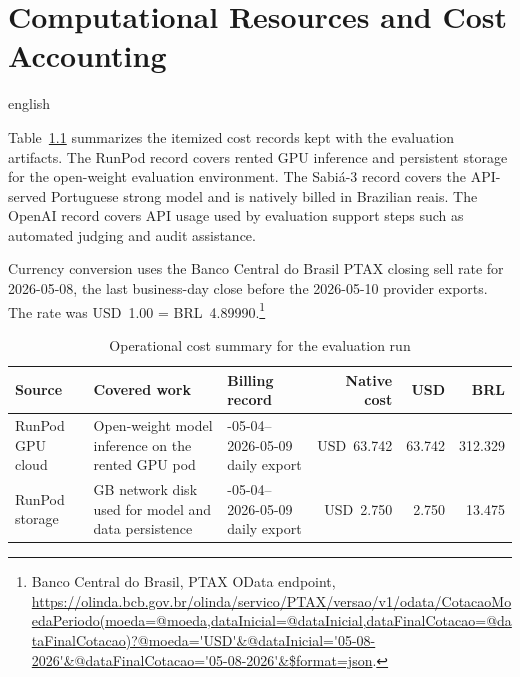 \chapter{Computational Resources and Cost Accounting}
\label{app:compute-cost-accounting}

\begin{otherlanguage*}{english}

Table~\ref{tab:compute-cost-summary} summarizes the itemized cost records kept with the evaluation artifacts. The RunPod record covers rented GPU inference and persistent storage for the open-weight evaluation environment. The Sabiá-3 record covers the API-served Portuguese strong model and is natively billed in Brazilian reais. The OpenAI record covers API usage used by evaluation support steps such as automated judging and audit assistance.

Currency conversion uses the Banco Central do Brasil PTAX closing sell rate for 2026-05-08, the last business-day close before the 2026-05-10 provider exports. The rate was USD~1.00 = BRL~4.89990.\footnote{Banco Central do Brasil, PTAX OData endpoint, \url{https://olinda.bcb.gov.br/olinda/servico/PTAX/versao/v1/odata/CotacaoMoedaPeriodo(moeda=@moeda,dataInicial=@dataInicial,dataFinalCotacao=@dataFinalCotacao)?@moeda='USD'&@dataInicial='05-08-2026'&@dataFinalCotacao='05-08-2026'&$format=json}.}

\begin{table}[htbp]
\centering
\footnotesize
\setlength\extrarowheight{2pt}
\setlength{\tabcolsep}{4pt}

\begin{tabularx}{\linewidth}{>{\raggedright\arraybackslash}p{2.35cm}>{\raggedright\arraybackslash}X>{\raggedright\arraybackslash}p{2.25cm}rrr}
\caption[Operational cost summary]{Operational cost summary for the evaluation run}
\label{tab:compute-cost-summary} \\
\toprule
\textbf{Source} & \textbf{Covered work} & \textbf{Billing record} & \textbf{Native cost} & \textbf{USD} & \textbf{BRL} \\
\midrule

RunPod GPU cloud &
Open-weight model inference on the rented GPU pod &
2026-05-04--2026-05-09 daily export &
USD~63.742 &
63.742 &
312.329 \\
\midrule

RunPod storage &
200 GB network disk used for model and data persistence &
2026-05-04--2026-05-09 daily export &
USD~2.750 &
2.750 &
13.475 \\
\midrule


\end{tabularx}
\end{table}
\end{otherlanguage*}

